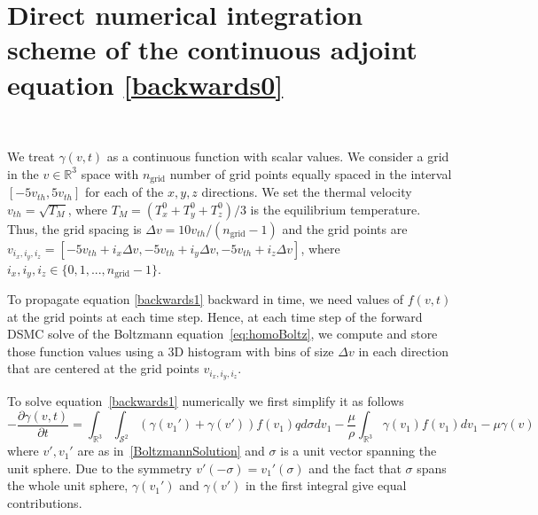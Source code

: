 \documentclass[times,final,nopreprintline]{elsarticle}
\newcommand{\bbR}{\mathbb R} \newcommand{\bbS}{\mathbb S}
\newcommand{\cS}{\mathcal S} \newcommand{\cT}{\mathcal T}
\newcommand{\Rthree}{{\bbR^3}}
\newcommand{\Stwo}{{\cS^2}}
\begin{document}




\appendix

\section{Direct numerical integration scheme of the continuous adjoint equation \eqref{backwards0}}~\label{A1}

We treat $\gamma(v,t)$ as a continuous function with scalar values. We consider a grid in the $v\in\Rthree$ space with $n_\text{grid}$ number of grid points equally spaced in the interval $[-5v_{th}, 5v_{th}]$ for each of the $x,y,z$ directions. We set the thermal velocity $v_{th}=\sqrt{T_M}$, where $T_M=(T_x^0+T_y^0+T_z^0)/3$ is the equilibrium temperature. Thus, the grid spacing is $\Delta v = 10v_{th}/(n_\text{grid}-1)$ and the grid points are $v_{i_x,i_y,i_z}=[-5v_{th}+i_x \Delta v, -5v_{th}+i_y \Delta v, -5v_{th}+i_z \Delta v]$, where $i_x,i_y,i_z \in \{0,1,...,n_\text{grid}-1\}$.

To propagate equation \eqref{backwards1} backward in time, we need values of $f(v,t)$ at the grid points at each time step. Hence, at each time step of the forward DSMC solve of the Boltzmann equation~\eqref{eq:homoBoltz}, we compute and store those function values using a 3D histogram with bins of size $\Delta v$ in each direction that are centered at the grid points $v_{i_x,i_y,i_z}$.

To solve equation~\eqref{backwards1} numerically we first simplify it as follows
\begin{equation} \label{backwards1_simplified}  
-\frac{\partial \gamma(v,t)}{\partial t} = \int_\Rthree \int_\Stwo(\gamma(v_1') + \gamma(v')) f(v_1) q d\sigma dv_1 - \frac{\mu}{\rho} \int_\Rthree \gamma(v_1) f(v_1) dv_1 -  \mu\gamma(v)
\end{equation}
where $v',v_1'$ are as in~\eqref{BoltzmannSolution} and $\sigma$ is a unit vector spanning the unit sphere. Due to the symmetry %
$v'(-\sigma)=v_1'(\sigma)$ and the fact that $\sigma$ spans the whole unit sphere, $\gamma(v_1')$ and $\gamma(v')$ in the first integral give equal contributions.
 
\end{document}
